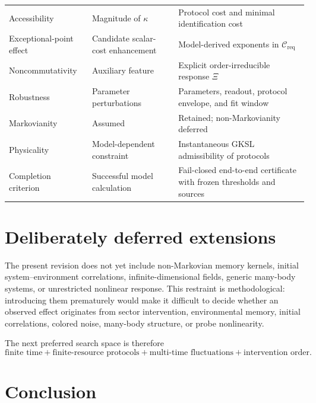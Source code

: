 \documentclass[11pt]{article}
\theoremstyle{definition}
\theoremstyle{remark}
\newcommand{\cC}{\mathcal C}
\newcommand{\XiI}{\Xi}
\begin{document}
\begin{longtable}{>{\raggedright\arraybackslash}p{} >{\raggedright\arraybackslash}p{} >{\raggedright\arraybackslash}p{}}
Accessibility & Magnitude of $\kappa$ & Protocol cost and minimal identification cost\\
Exceptional-point effect & Candidate scalar-cost enhancement & Model-derived exponents in $\cC_{\mathrm{req}}$\\
Noncommutativity & Auxiliary feature & Explicit order-irreducible response $\XiI$\\
Robustness & Parameter perturbations & Parameters, readout, protocol envelope, and fit window\\
Markovianity & Assumed & Retained; non-Markovianity deferred\\
Physicality & Model-dependent constraint & Instantaneous GKSL admissibility of protocols\\
Completion criterion & Successful model calculation & Fail-closed end-to-end certificate with frozen thresholds and sources\\
\bottomrule
\end{longtable}

\section{Deliberately deferred extensions}

The present revision does not yet include non-Markovian memory kernels, initial system--environment correlations, infinite-dimensional fields, generic many-body systems, or unrestricted nonlinear response. This restraint is methodological: introducing them prematurely would make it difficult to decide whether an observed effect originates from sector intervention, environmental memory, initial correlations, colored noise, many-body structure, or probe nonlinearity.

The next preferred search space is therefore
\begin{equation}
\boxed{
\text{finite time}
+\text{finite-resource protocols}
+\text{multi-time fluctuations}
+\text{intervention order}.
}
\end{equation}

\section{Conclusion}
\end{document}
